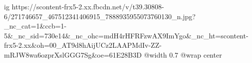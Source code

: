  
 
 
 
 

\ifcmt
  ig https://scontent-frx5-2.xx.fbcdn.net/v/t39.30808-6/271746657_467512341406915_7888935955073760130_n.jpg?_nc_cat=1&ccb=1-5&_nc_sid=730e14&_nc_ohc=mdH4rHFRFzwAX9ImYgo&_nc_ht=scontent-frx5-2.xx&oh=00_AT9d8hAijUCz2LAAPMdIv-ZZ-mRJW8wa6ozprXslGGG7Sg&oe=61E28B3D
	@width 0.7
	@wrap center
\fi

